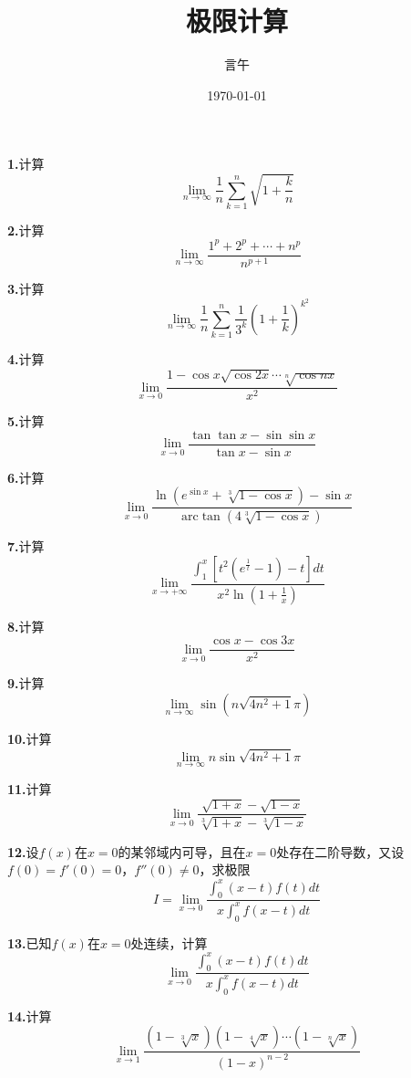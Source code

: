 \documentclass[10pt]{article}
\title{极限计算}
\author{言午}
\date{\today}
\begin{document}
	\maketitle
	
	\textbf{1.}计算
	$$
	\lim_{n\rightarrow \infty} \frac{1}{n}\sum_{k=1}^n{\sqrt{1+\frac{k}{n}}}
	$$
	
	\textbf{2.}计算
	$$
	\lim_{n\rightarrow \infty} \frac{1^p+2^p+\cdots +n^p}{n^{p+1}}
	$$
	
	\textbf{3.}计算
	$$
	\lim_{n\rightarrow \infty} \frac{1}{n}\sum_{k=1}^n{\frac{1}{3^k}\left( 1+\frac{1}{k} \right) ^{k^2}}
	$$
	
	\textbf{4.}计算
	$$
	\lim_{x\rightarrow 0} \frac{1-\cos x\sqrt{\cos 2x}\cdots \sqrt[n]{\cos nx}}{x^2}
	$$
	
	\textbf{5.}计算
	$$
	\lim_{x\rightarrow 0} \frac{\tan\tan x-\sin\sin x}{\tan x-\sin x}
	$$
	
	\textbf{6.}计算
	\begin{equation*}
		\lim_{x\rightarrow 0} \frac{\ln \left( e^{\sin x}+\sqrt[3]{1-\cos x} \right) -\sin x}{\text{arc}\tan\left( 4\sqrt[3]{1-\cos x} \right)}
	\end{equation*}
	
	\textbf{7.}计算
	$$
	\lim_{x\rightarrow +\infty} \frac{\int_1^x{\left[ t^2\left( e^{\frac{1}{t}}-1 \right) -t \right] dt}}{x^2\ln \left( 1+\frac{1}{x} \right)}
	$$
	
	\textbf{8.}计算
	$$
	\lim_{x\rightarrow 0} \frac{\cos x-\cos 3x}{x^2}
	$$
	
	\textbf{9.}计算
	$$
	\lim_{n\rightarrow \infty} \sin \left( n\sqrt{4n^2+1}\pi \right)
	$$
	
	\textbf{10.}计算
	$$
	\lim_{n\rightarrow \infty} n\sin \sqrt{4n^2+1}\pi
	$$
	
	\textbf{11.}计算
	$$
	\lim_{x\rightarrow 0} \frac{\sqrt{1+x}-\sqrt{1-x}}{\sqrt[3]{1+x}-\sqrt[3]{1-x}}
	$$
	
	\textbf{12.}设$f\left( x \right)$在$x=0$的某邻域内可导，且在$x=0$处存在二阶导数，又设$f\left( 0 \right) =f'\left( 0 \right) =0$，$f''\left( 0 \right) \ne 0$，求极限
	$$
	I=\lim_{x\rightarrow 0} \frac{\int_0^x{\left( x-t \right) f\left( t \right) dt}}{x\int_0^x{f\left( x-t \right) dt}}
	$$
	
	\textbf{13.}已知$f\left( x \right)$在$x=0$处连续，计算
	$$
	\lim_{x\rightarrow 0} \frac{\int_0^x{\left( x-t \right) f\left( t \right) dt}}{x\int_0^x{f\left( x-t \right) dt}}
	$$
	
	\textbf{14.}计算
	$$
	\lim_{x\rightarrow 1} \frac{\left( 1-\sqrt[3]{x} \right) \left( 1-\sqrt[4]{x} \right) \cdots \left( 1-\sqrt[n]{x} \right)}{\left( 1-x \right) ^{n-2}}
	$$
	
\end{document}
